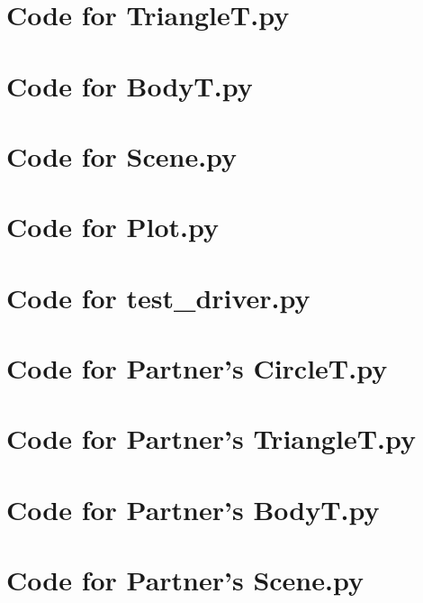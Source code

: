 \documentclass[12pt]{article}
\begin{document}
\noindent 

\newpage

\section{Code for TriangleT.py}

\noindent 

\newpage

\section{Code for BodyT.py}

\noindent 

\newpage

\section{Code for Scene.py}

\noindent 

\newpage

\section{Code for Plot.py}

\noindent 

\newpage

\section{Code for test\_driver.py}

\noindent 

\newpage

\section{Code for Partner's CircleT.py}

\noindent 

\newpage

\section{Code for Partner's TriangleT.py}

\noindent 

\newpage

\section{Code for Partner's BodyT.py}

\noindent 

\newpage

\section{Code for Partner's Scene.py}

\noindent 

\newpage
\end{document}
